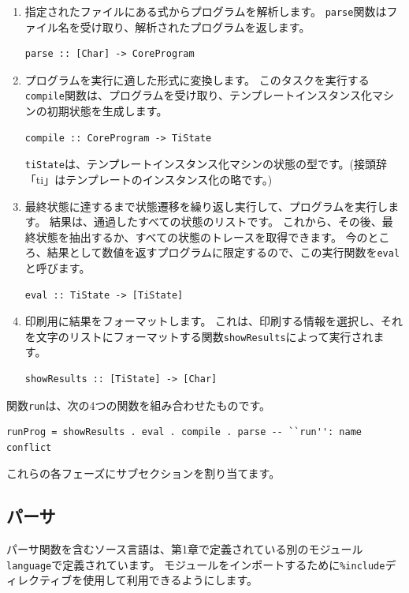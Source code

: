 \documentclass{jbook}
\begin{document}
\begin{enumerate}
	\item 指定されたファイルにある式からプログラムを解析します。
	      \texttt{parse}関数はファイル名を受け取り、解析されたプログラムを返します。
	      \begin{verbatim}
parse :: [Char] -> CoreProgram
\end{verbatim}
	\item プログラムを実行に適した形式に変換します。
	      このタスクを実行する\texttt{compile}関数は、プログラムを受け取り、テンプレートインスタンス化マシンの初期状態を生成します。
	      \begin{verbatim}
compile :: CoreProgram -> TiState
\end{verbatim}
	      \texttt{tiState}は、テンプレートインスタンス化マシンの状態の型です。(接頭辞「ti」はテンプレートのインスタンス化の略です。)
	\item 最終状態に達するまで状態遷移を繰り返し実行して、プログラムを実行します。
	      結果は、通過したすべての状態のリストです。
	      これから、その後、最終状態を抽出するか、すべての状態のトレースを取得できます。
	      今のところ、結果として数値を返すプログラムに限定するので、この実行関数を\texttt{eval}と呼びます。
	      \begin{verbatim}
eval :: TiState -> [TiState]
\end{verbatim}
	\item 印刷用に結果をフォーマットします。
	      これは、印刷する情報を選択し、それを文字のリストにフォーマットする関数\texttt{showResults}によって実行されます。
	      \begin{verbatim}
showResults :: [TiState] -> [Char]
\end{verbatim}
\end{enumerate}

関数\texttt{run}は、次の4つの関数を組み合わせたものです。

\begin{verbatim}
runProg = showResults . eval . compile . parse -- ``run'': name conflict
\end{verbatim}

これらの各フェーズにサブセクションを割り当てます。

\subsection{パーサ}

パーサ関数を含むソース言語は、第1章で定義されている別のモジュール\texttt{language}で定義されています。
モジュールをインポートするために\texttt{\%include}ディレクティブを使用して利用できるようにします。
\end{document}
